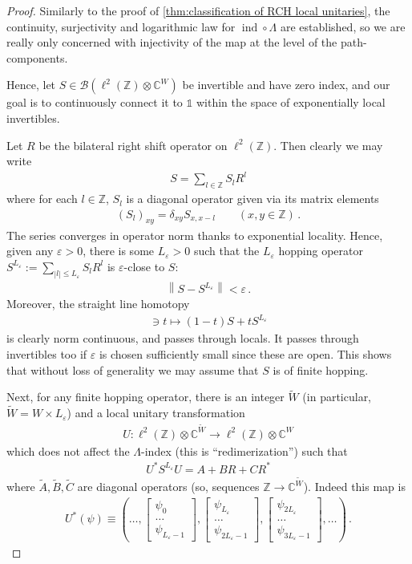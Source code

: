 \documentclass[a4paper,10pt]{article}
\numberwithin{equation}{section}
\theoremstyle{plain}
\theoremstyle{plain}
\theoremstyle{plain}
\theoremstyle{plain}
\theoremstyle{plain}
\theoremstyle{remark}
\theoremstyle{definition}
\theoremstyle{plain}
\newcommand{\ZZ}{\mathbb{Z}}
\newcommand{\CC}{\mathbb{C}}
\newcommand{\calB}{\mathcal{B}}
\newcommand{\bbLambda}{\mathbb{\Lambda}}
\newcommand\norm[1]{\left\lVert#1\right\rVert}
\newcommand{\ve}{\varepsilon}
\newcommand{\Id}{\mathds{1}}
\newcommand{\findex}{\operatorname{ind}}
\newcommand{\eq}[1]{\begin{align*}#1\end{align*}}
\begin{document}
	\begin{proof}
		Similarly to the proof of \cref{thm:classification of RCH local unitaries}, the continuity, surjectivity and logarithmic law for $\findex\circ\bbLambda$ are established, so we are really only concerned with injectivity of the map at the level of the path-components.
		
		Hence, let $S\in\calB(\ell^2(\ZZ)\otimes\CC^W)$ be invertible and have zero index, and our goal is to continuously connect it to $\Id$ within the space of exponentially local invertibles.
		
		Let $R$ be the bilateral right shift operator on $\ell^2(\ZZ)$. Then clearly we may write \eq{ S = \sum_{l\in\ZZ} S_l R^l} where for each $l\in\ZZ$, $S_l$ is a diagonal operator given via its matrix elements \eq{ (S_l)_{xy} = \delta_{xy} S_{x,x-l}\qquad(x,y\in\ZZ)\,.} The series converges in operator norm thanks to exponential locality. Hence, given any $\ve>0$, there is some $L_\ve>0$ such that the $L_\ve$ hopping operator $S^{L_\ve} := \sum_{|l|\leq L_\ve}S_lR^l$ is $\ve$-close to $S$: \eq{ \norm{S - S^{L_\ve}}<\ve\,.} Moreover, the straight line homotopy \eq{[0,1]\ni t \mapsto (1-t) S + t S^{L_\ve}} is clearly norm continuous, and passes through locals. It passes through invertibles too if $\ve$ is chosen sufficiently small since these are open. This shows that without loss of generality we may assume that $S$ is of finite hopping. 
		
		Next, for any finite hopping operator, there is an integer $\widetilde{W}$ (in particular, $\widetilde{W}=W\times L_\ve$) and a local unitary transformation \eq{U:\ell^2(\ZZ)\otimes\CC^{\widetilde{W}}\to\ell^2(\ZZ)\otimes\CC^{W}} which does not affect the $\Lambda$-index (this is ``redimerization'') such that \eq{ U^\ast S^{L_\ve} U = A+BR+CR^\ast} where $\widetilde{A},\widetilde{B},\widetilde{C}$ are diagonal operators (so, sequences $\ZZ\to\CC^{\widetilde{W}}$). Indeed this map is \eq{U^\ast(\psi) \equiv (\dots,\begin{bmatrix}\psi_{0}\\\dots\\\psi_{L_\ve-1}\end{bmatrix},\begin{bmatrix}\psi_{L_\ve}\\\dots\\\psi_{2L_\ve-1}\end{bmatrix},\begin{bmatrix}\psi_{2L_\ve}\\\dots\\\psi_{3L_\ve-1}\end{bmatrix},\dots)\,.}
		

\end{proof}
\end{document}
